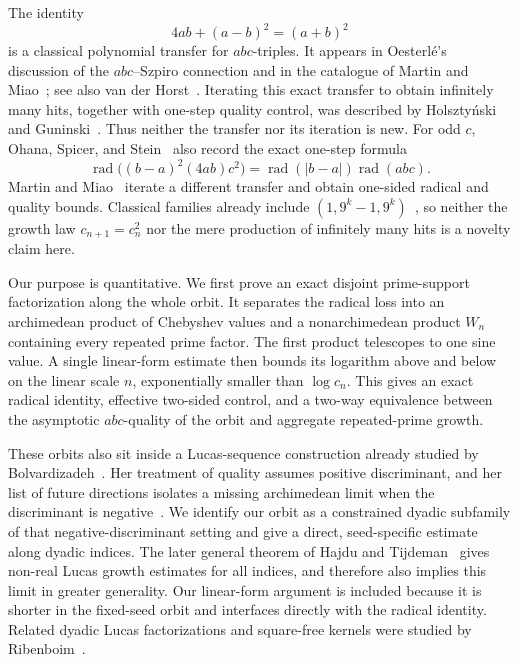 \documentclass[11pt]{article}
\theoremstyle{remark}
\newcommand{\rad}{\operatorname{rad}}
\begin{document}
The identity
\[
 4ab+(a-b)^2=(a+b)^2                                      \tag{1.1}
\]
is a classical polynomial transfer for \(abc\)-triples.  It appears in
Oesterl\'e's discussion of the \(abc\)--Szpiro connection
\cite[p.~170]{Oesterle1988} and in the catalogue of Martin and
Miao~\cite[\S2.4]{MartinMiao2016}; see also
van der Horst~\cite[\S2.3]{vanderHorst2010}.  Iterating this exact
transfer to obtain infinitely many hits, together with one-step quality
control, was described by Holszty\'nski~\cite{Holsztynski2017} and
Guninski~\cite{Guninski2020}.  Thus neither the transfer nor its
iteration is new.  For odd \(c\), Ohana, Spicer, and
Stein~\cite[Prop.~1]{OhanaSpicerStein2013} also record the exact
one-step formula
\[
 \rad\bigl((b-a)^2(4ab)c^2\bigr)
 =\rad(|b-a|)\rad(abc).
\]
Martin and Miao~\cite[\S3.1]{MartinMiao2016} iterate a different
transfer and obtain one-sided radical and quality bounds.
Classical families already include
\((1,9^k-1,9^k)\)~\cite{AlvarezEtAl2023}, so neither the growth law
\(c_{n+1}=c_n^2\) nor the mere production of infinitely many hits is a
novelty claim here.

Our purpose is quantitative.  We first prove an exact disjoint
prime-support factorization along the whole orbit.  It separates the
radical loss into an archimedean product of Chebyshev values and a
nonarchimedean product \(W_n\) containing every repeated prime factor.
The first product telescopes to one sine value.  A single linear-form
estimate then bounds its logarithm above and below on the linear scale
\(n\), exponentially smaller than \(\log c_n\).  This gives an exact
radical identity, effective two-sided control, and a two-way equivalence
between the asymptotic \(abc\)-quality of the orbit and aggregate
repeated-prime growth.

These orbits also sit inside a Lucas-sequence construction already
studied by Bolvardizadeh~\cite[Ch.~2]{Bolvardizadeh2023}.  Her treatment
of quality assumes positive discriminant, and her list of future
directions isolates a missing archimedean limit when the discriminant is
negative~\cite[pp.~63--64]{Bolvardizadeh2023}.  We identify our orbit as
a constrained dyadic subfamily of that negative-discriminant setting and
give a direct, seed-specific estimate along dyadic indices.  The later
general theorem of Hajdu and Tijdeman~\cite[Theorem~2.1 and
Remark~1]{HajduTijdeman2025} gives non-real Lucas growth estimates for
all indices, and therefore also implies this limit in greater
generality.  Our linear-form argument is included because it is shorter
in the fixed-seed orbit and interfaces directly with the radical
identity.  Related dyadic Lucas factorizations and square-free kernels
were studied by Ribenboim~\cite{Ribenboim2002}.
\end{document}
